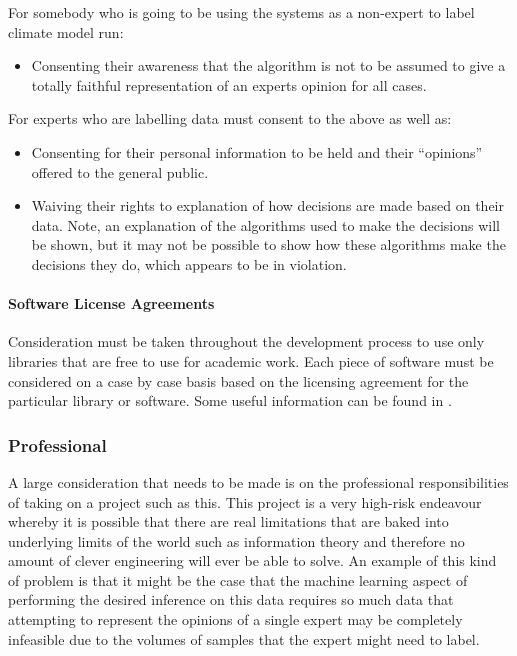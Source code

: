 \documentclass{ecmm427_assignment}
\begin{document}
For somebody who is going to be using the systems as a non-expert
to label climate model run:
\begin{itemize}
\item Consenting their awareness that the algorithm is not to be assumed
to give a totally faithful representation of an experts opinion for
all cases.
\end{itemize}
For experts who are labelling data must consent to the above as well
as:
\begin{itemize}
\item Consenting for their personal information to be held and their ``opinions''
offered to the general public.
\item Waiving their rights to explanation of how decisions are made based
on their data. Note, an explanation of the algorithms used to make
the decisions will be shown, but it may not be possible to show how
these algorithms make the decisions they do, which appears to be in
violation.
\end{itemize}

\paragraph{Software License Agreements}

\quad Consideration must be taken throughout the development process to use
only libraries that are free to use for academic work. Each piece of software must be considered on a case by case basis based on the licensing agreement for
the particular library or software. Some useful information can be found in \cite{ethicalandlegal}.


\subsubsection{Professional}

\quad A large consideration that needs to be made is on the professional
responsibilities of taking on a project such as this. This project
is a very high-risk endeavour whereby it is possible that there
are real limitations that are baked into underlying limits of the world
such as information theory and therefore no amount of clever engineering
will ever be able to solve. An example of this kind of problem is
that it might be the case that the machine learning aspect of performing
the desired inference on this data requires so much data that attempting
to represent the opinions of a single expert may be completely infeasible
due to the volumes of samples that the expert might need to label. 
\end{document}
